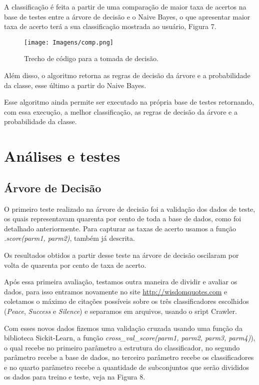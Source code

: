 \documentclass[preprint,12pt,times]{elsarticle}
\begin{document}
	A classificação é feita a partir de uma comparação de maior taxa de acertos na base de testes entre a árvore de decisão e o Naive Bayes, o que apresentar maior taxa de acerto terá a sua classificação mostrada ao usuário, Figura 7.

	\begin{figure}[h]
		\centering\texttt{[image: Imagens/comp.png]}
		\caption{Trecho de código para a tomada de decisão.}
	\end{figure}

	Além disso, o algoritmo retorna as regras de decisão da árvore e a probabilidade da classe, esse último a partir do Naive Bayes.
	
	Esse algoritmo ainda permite ser executado na própria base de testes retornando, com essa execução, a melhor classificação, as regras de decisão da árvore e a probabilidade da classe.
	
	\section{Análises e testes}
	\label{Análises e testess}
	
	\subsection{Árvore de Decisão}
	O primeiro teste realizado na árvore de decisão foi a validação dos dados de teste, os quais representavam quarenta por cento de toda a base de dados, como foi detalhado anteriormente. Para capturar as taxas de acerto usamos a função \textit{.score(parm1, parm2)}, também já descrita. 
	
	Os resultados obtidos a partir desse teste na árvore de decisão oscilaram por volta de quarenta por cento de taxa de acerto.
	
	Após essa primeira avaliação, testamos outra maneira de dividir e avaliar os dados, para isso entramos novamente no site \url{http://wisdomquotes.com} e coletamos o máximo de citações possíveis sobre os três classificadores escolhidos (\textit{Peace}, \textit{Success} e \textit{Silence}) e separamos em arquivos, usando o sript Crawler.
	
	Com esses novos dados fizemos uma validação cruzada usando uma função da biblioteca Sickit-Learn, a função \textit{cross\_val\_score(parm1, parm2, parm3, parm4)}), o qual recebe no primeiro parâmetro a estrutura do classificador, no segundo parâmetro recebe a base de dados, no terceiro parâmetro recebe os classificadores e no quarto parâmetro recebe a quantidade de subconjuntos que serão divididos os dados para treino e teste, veja na Figura 8. 
	
\end{document}
